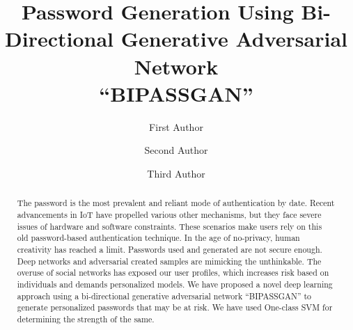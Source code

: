 \documentclass[runningheads]{llncs}
\newcommand{\quotes}[1]{``#1''}
\begin{document}
%
\title{Password Generation Using Bi-Directional Generative Adversarial Network\\ \quotes{BIPASSGAN}}
%
%
\author{First Author \and
Second Author \and
Third Author}
%
%
%
\maketitle              %
%

\begin{abstract}
The password is the most prevalent and reliant mode of authentication by date. Recent advancements in IoT have propelled various other mechanisms, but they face severe issues of hardware and software constraints. These scenarios make users rely on this old password-based authentication technique. In the age of no-privacy, human creativity has reached a limit. Passwords used and generated are not secure enough. Deep networks and adversarial created samples are mimicking the unthinkable. The overuse of social networks has exposed our user profiles, which increases risk based on individuals and demands personalized models. We have proposed a novel deep learning approach using a bi-directional generative adversarial network  \quotes{BIPASSGAN} to generate personalized passwords that may be at risk. We have used One-class SVM for determining the strength of the same.

\end{abstract}
\end{document}

